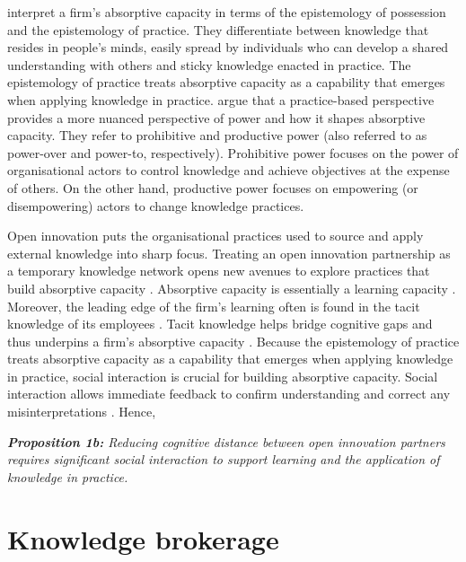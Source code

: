 \citet{marabelli2014knowing} interpret a firm's absorptive capacity in terms of the epistemology of possession and the epistemology of practice. They differentiate between knowledge that resides in people's minds, easily spread by individuals who can develop a shared understanding with others and sticky knowledge enacted in practice. The epistemology of practice treats absorptive capacity as a capability that emerges when applying knowledge in practice. \citet{marabelli2014knowing} argue that a practice-based perspective provides a more nuanced perspective of power and how it shapes absorptive capacity. They refer to prohibitive and productive power (also referred to as power-over and power-to, respectively). Prohibitive power focuses on the power of organisational actors to control knowledge and achieve objectives at the expense of others. On the other hand, productive power focuses on empowering (or disempowering) actors to change knowledge practices. \medskip

Open innovation puts the organisational practices used to source and apply external knowledge into sharp focus. Treating an open innovation partnership as a temporary knowledge network opens new avenues to explore practices that build absorptive capacity \citep{vanhaverbeke2007connecting,xia2016unpacking}. Absorptive capacity is essentially a learning capacity \citep{cohen1989innovation, cohen1990absorptive, nooteboom2000learning, lichtenthaler2009absorptive}. Moreover, the leading edge of the firm's learning often is found in the tacit knowledge of its employees \citep{horvath2000working}. Tacit knowledge helps bridge cognitive gaps and thus underpins a firm's absorptive capacity \citep{thomas2021tacit}. Because the epistemology of practice treats absorptive capacity as a capability that emerges when applying knowledge in practice, social interaction is crucial for building absorptive capacity. Social interaction allows immediate feedback to confirm understanding and correct any misinterpretations \citep{haldin2000difficulties,gertler2003tacit,koskinen2003tacit}. Hence, \bigskip

\begin{tcolorbox}
\textit{\textbf{Proposition 1b:} Reducing cognitive distance between open innovation partners requires significant social interaction to support learning and the application of knowledge in practice.}
\end{tcolorbox}

\section{Knowledge brokerage}

